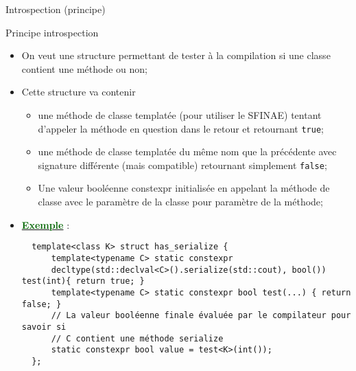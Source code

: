 \documentclass[compress,10pt,aspectratio=169]{beamer}
\begin{document}
  \begin{frame}[fragile]{Introspection (principe)}
  \scriptsize\vspace*{-4mm}
  \begin{exampleblock}{\small Principe introspection}
  \begin{itemize}
  \item On veut une structure permettant de tester à la compilation si une 
        classe contient une méthode ou non;
  \item Cette structure va contenir 
  \begin{itemize}
  \scriptsize
  \item une méthode de classe templatée (pour utiliser le SFINAE) tentant 
        d'appeler la méthode en question dans le retour et retournant \texttt{true};
  \item une méthode de classe templatée du même nom que la précédente
        avec signature différente (mais compatible) retournant simplement 
        \texttt{false};
  \item Une valeur booléenne constexpr initialisée en appelant la méthode de classe
        avec le paramètre de la classe pour paramètre de la méthode;
  \end{itemize}
  \item \underline{\textcolor{DarkGreen}{\bf Exemple}} :
  \begin{verbatim}
  template<class K> struct has_serialize {
      template<typename C> static constexpr 
      decltype(std::declval<C>().serialize(std::cout), bool()) test(int){ return true; }
      template<typename C> static constexpr bool test(...) { return false; }
      // La valeur booléenne finale évaluée par le compilateur pour savoir si 
      // C contient une méthode serialize
      static constexpr bool value = test<K>(int());
  };
  \end{verbatim}
  \end{itemize}
  \end{exampleblock}
  \end{frame}
  
\end{document}

